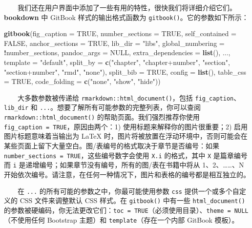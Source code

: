 \documentclass[
  12pt,
]{krantz}
\newenvironment{Shaded}{\begin{snugshade}}{\end{snugshade}}
\newcommand{\AttributeTok}[1]{\textcolor[rgb]{0.13,0.29,0.53}{#1}}
\newcommand{\ConstantTok}[1]{\textcolor[rgb]{0.56,0.35,0.01}{#1}}
\newcommand{\FunctionTok}[1]{\textcolor[rgb]{0.13,0.29,0.53}{\textbf{#1}}}
\newcommand{\NormalTok}[1]{#1}
\newcommand{\SpecialCharTok}[1]{\textcolor[rgb]{0.81,0.36,0.00}{\textbf{#1}}}
\newcommand{\StringTok}[1]{\textcolor[rgb]{0.31,0.60,0.02}{#1}}
\theoremstyle{definition}
\theoremstyle{definition}
\theoremstyle{definition}
\theoremstyle{definition}
\theoremstyle{remark}
\begin{document}
  我们还在用户界面中添加了一些有用的特性，很快我们将详细介绍它们。\textbf{bookdown} 中 GitBook 样式的输出格式函数为 \texttt{gitbook()}。它的参数如下所示：

\begin{Shaded}
\begin{Highlighting}[]
\FunctionTok{gitbook}\NormalTok{(}\AttributeTok{fig\_caption =} \ConstantTok{TRUE}\NormalTok{, }\AttributeTok{number\_sections =} \ConstantTok{TRUE}\NormalTok{,}
  \AttributeTok{self\_contained =} \ConstantTok{FALSE}\NormalTok{, }\AttributeTok{anchor\_sections =} \ConstantTok{TRUE}\NormalTok{,}
  \AttributeTok{lib\_dir =} \StringTok{"libs"}\NormalTok{,}
  \AttributeTok{global\_numbering =} \SpecialCharTok{!}\NormalTok{number\_sections,}
  \AttributeTok{pandoc\_args =} \ConstantTok{NULL}\NormalTok{, }\AttributeTok{extra\_dependencies =} \FunctionTok{list}\NormalTok{(), ...,}
  \AttributeTok{template =} \StringTok{"default"}\NormalTok{,}
  \AttributeTok{split\_by =} \FunctionTok{c}\NormalTok{(}\StringTok{"chapter"}\NormalTok{, }\StringTok{"chapter+number"}\NormalTok{, }\StringTok{"section"}\NormalTok{, }\StringTok{"section+number"}\NormalTok{, }\StringTok{"rmd"}\NormalTok{, }\StringTok{"none"}\NormalTok{),}
  \AttributeTok{split\_bib =} \ConstantTok{TRUE}\NormalTok{, }\AttributeTok{config =} \FunctionTok{list}\NormalTok{(), }\AttributeTok{table\_css =} \ConstantTok{TRUE}\NormalTok{,}
  \AttributeTok{code\_folding =} \FunctionTok{c}\NormalTok{(}\StringTok{"none"}\NormalTok{, }\StringTok{"show"}\NormalTok{, }\StringTok{"hide"}\NormalTok{))}
\end{Highlighting}
\end{Shaded}

  大多数参数被传递给 \texttt{rmarkdown::html\_document()}，包括 \texttt{fig\_caption}、\texttt{lib\_dir} 和 \texttt{...}。想要了解所有可能参数的完整列表，你可以查阅 \texttt{rmarkdown::html\_document()} 的帮助页面。我们强烈推荐你使用 \texttt{fig\_caption\ =\ TRUE}，原因由两个：1) 使用标题来解释你的图片很重要；2) 启用图片标题意味着当输出为 LaTeX 时，图片将被放置在浮动环境中，否则可能会在某些页面上留下大量空白。图/表编号的格式取决于章节是否编号：如果 \texttt{number\_sections\ =\ TRUE}，这些编号数字会使用 \texttt{X.i} 的格式，其中 \texttt{X} 是篇章编号而 \texttt{i} 是递增编号；如果章节没有编号，所有的图/表在书籍中将从 1、2、\ldots\ldots、N 开始依次编号。请注意，在任何一种情况下，图片和表格的编号都是相互独立的。

  在 \texttt{...} 的所有可能的参数之中，你最可能使用参数 \texttt{css} 提供一个或多个自定义的 CSS 文件来调整默认 CSS 样式。在 \texttt{gitbook()} 中有一些 \texttt{html\_document()} 的参数被硬编码，你无法更改它们：\texttt{toc\ =\ TRUE}（必须使用目录）、\texttt{theme\ =\ NULL}（不使用任何 Bootstrap 主题）和 \texttt{template}（存在一个内部 GitBook 模板）。
\end{document}
